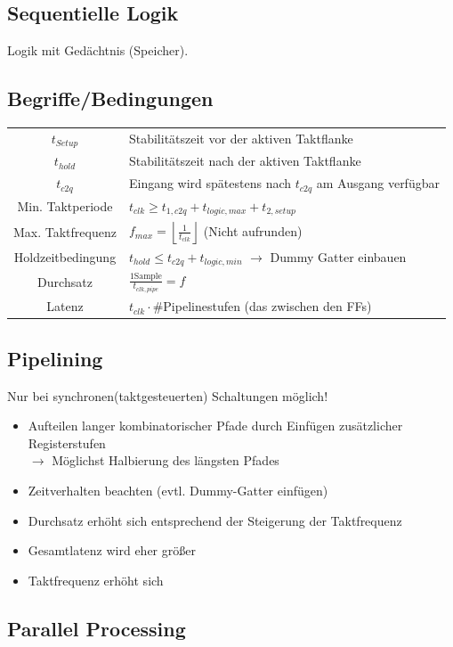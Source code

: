\documentclass[6pt,a4paper]{scrartcl}
\newcommand{\ra}[0]{\ensuremath{\rightarrow}} 									%
\begin{document}
\begin{multicols*}{3}
\section{Sequentielle Logik}
Logik mit Gedächtnis (Speicher).
	\subsection{Begriffe/Bedingungen}
	\begin{tabular}{c|l}
	$t_{Setup}$ & Stabilitätszeit vor der aktiven Taktflanke\\
	$t_{hold}$ & Stabilitätszeit nach  der aktiven Taktflanke\\
	$t_{c2q}$ & Eingang wird spätestens nach $t_{c2q}$ am Ausgang verfügbar\\
	 Min. Taktperiode &  $t_{clk} \ge t_{1,c2q} + t_{logic,max} + t_{2,setup}$  \\
	 Max. Taktfrequenz & $f_{max} = \left\lfloor \frac{1}{t_{clk}} \right\rfloor$ \qquad (Nicht aufrunden) \\
	 Holdzeitbedingung & $t_{hold} \le t_{c2q} + t_{logic,min}$  $\ra$ Dummy Gatter einbauen\\
	 Durchsatz & $\frac{1 \text{Sample}}{t_{clk,pipe}} = f$ \\
	 Latenz & $t_{clk} \cdot \#$Pipelinestufen (das zwischen den FFs) \\
	\end{tabular}


	\subsection{Pipelining} %
	Nur bei synchronen(taktgesteuerten) Schaltungen möglich!
	\begin{itemize} \itemsep0pt
		\item Aufteilen langer kombinatorischer Pfade durch Einfügen zusätzlicher Registerstufen\\
		$\ra$ Möglichst Halbierung des längsten Pfades
		\item Zeitverhalten beachten (evtl. Dummy-Gatter einfügen)
		\item Durchsatz erhöht sich entsprechend der Steigerung der Taktfrequenz
		\item Gesamtlatenz wird eher größer
		\item Taktfrequenz erhöht sich
	\end{itemize}

	\subsection{Parallel Processing} %


\end{multicols*}
\end{document}
